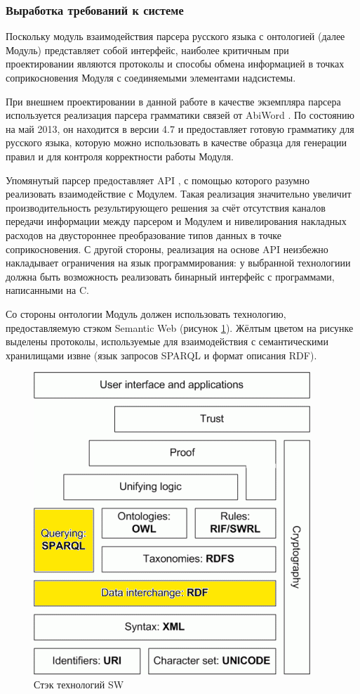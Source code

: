 \subsubsection{Выработка требований к системе}

Поскольку модуль взаимодействия парсера русского языка с онтологией (далее Модуль) представляет собой интерфейс, наиболее критичным при проектировании являются протоколы и способы обмена информацией в точках соприкосновения Модуля с соединяемыми элементами надсистемы.

При внешнем проектировании в данной работе в качестве экземпляра парсера используется реализация парсера грамматики связей от AbiWord \cite{abiparser}. По состоянию на май 2013, он находится в версии 4.7 и предоставляет готовую грамматику для русского языка, которую можно использовать в качестве образца для генерации правил и для контроля корректности работы Модуля.

Упомянутый парсер предоставляет API \cite{api}, с помощью которого разумно реализовать взаимодействие с Модулем. Такая реализация значительно увеличит производительность результирующего решения за счёт отсутствия каналов передачи информации между парсером и Модулем и нивелирования накладных расходов на двустороннее преобразование типов данных в точке соприкосновения. С другой стороны, реализация на основе API неизбежно накладывает ограничения на язык программирования: у выбранной технологиии должна быть возможность реализовать бинарный интерфейс с программами, написанными на C.

Со стороны онтологии Модуль должен использовать технологию, предоставляемую стэком Semantic Web (рисунок \ref{fig:swstack}). Жёлтым цветом на рисунке выделены протоколы, используемые для взаимодействия с семантическими хранилищами извне (язык запросов SPARQL и формат описания RDF). 

\begin{figure}[H]
	\centering
		\includegraphics[scale=1.0]{images/swstack.png}
	\caption{\small Стэк технологий SW}
	\label{fig:swstack}
\end{figure} 

